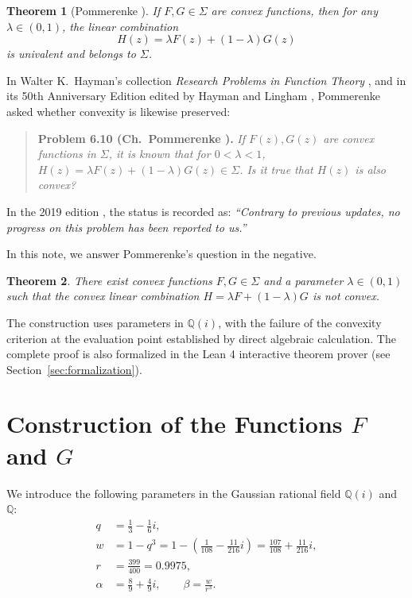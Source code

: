 \documentclass[11pt,reqno]{amsart}
\newtheorem{theorem}{Theorem}[section]
\theoremstyle{definition}
\begin{document}
\begin{theorem}[Pommerenke \cite{Pommerenke1962}]\label{thm:pommerenke-univalent}
If $F, G \in \Sigma$ are convex functions, then for any $\lambda \in (0,1)$, the linear combination
\begin{equation}
H(z) = \lambda F(z) + (1-\lambda) G(z)
\end{equation}
is univalent and belongs to $\Sigma$.
\end{theorem}

In Walter K.~Hayman's collection \emph{Research Problems in Function Theory} \cite{Hayman1967}, and in its 50th Anniversary Edition edited by Hayman and Lingham \cite{HaymanLingham2019}, Pommerenke asked whether convexity is likewise preserved:

\begin{quote}
\textbf{Problem 6.10 (Ch.~Pommerenke \cite{Hayman1967,HaymanLingham2019}).} \emph{If $F(z), G(z)$ are convex functions in $\Sigma$, it is known that for $0 < \lambda < 1$, $H(z) = \lambda F(z) + (1 - \lambda)G(z) \in \Sigma$. Is it true that $H(z)$ is also convex?}
\end{quote}

In the 2019 edition \cite[Update 6.10]{HaymanLingham2019}, the status is recorded as: \emph{``Contrary to previous updates, no progress on this problem has been reported to us.''}

In this note, we answer Pommerenke's question in the negative.

\begin{theorem}\label{thm:main}
There exist convex functions $F, G \in \Sigma$ and a parameter $\lambda \in (0, 1)$ such that the convex linear combination $H = \lambda F + (1-\lambda)G$ is not convex.
\end{theorem}

The construction uses parameters in $\mathbb{Q}(i)$, with the failure of the convexity criterion at the evaluation point established by direct algebraic calculation. The complete proof is also formalized in the \textsf{Lean 4} interactive theorem prover (see Section~\ref{sec:formalization}).

\section{Construction of the Functions \texorpdfstring{$F$}{F} and \texorpdfstring{$G$}{G}}

We introduce the following parameters in the Gaussian rational field $\mathbb{Q}(i)$ and $\mathbb{Q}$:
\begin{align}
q &= \frac{1}{3} - \frac{1}{6}i, \label{eq:def-q}\\
w &= 1 - q^3 = 1 - \left(\frac{1}{108} - \frac{11}{216}i\right) = \frac{107}{108} + \frac{11}{216}i, \label{eq:def-w}\\
r &= \frac{399}{400} = 0.9975, \label{eq:def-r}\\
\alpha &= \frac{8}{9} + \frac{4}{9}i, \qquad \beta = \frac{w}{r^3}. \label{eq:def-alpha-beta}
\end{align}
\end{document}

